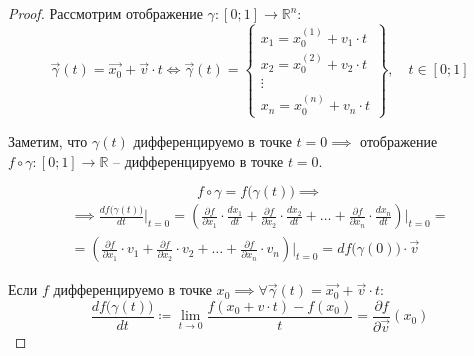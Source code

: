 \begin{proof}
    Рассмотрим отображение $\gamma:[0;1]\rightarrow \mathbb{R}^n$:
    \[
        \vec{\gamma}(t) = \vec{x_0} + \vec{v}\cdot t \iff \vec{\gamma}(t) = \left\{\begin{array}{l}
            x_1 = x_0^{(1)} + v_1 \cdot t \\
            x_2 = x_0^{(2)} + v_2 \cdot t \\
            \vdots                        \\
            x_n = x_0^{(n)} + v_n \cdot t
        \end{array}\right\}, \quad t \in [0;1]
    \]

    Заметим, что $\gamma(t)$ дифференцируемо в точке $t = 0 \implies$ отображение $f \circ \gamma:[0;1]\rightarrow\mathbb{R}$ -- дифференцируемо в точке $t = 0$.

    \[
        f\circ\gamma = f\big(\gamma(t)\big) \implies
    \]
    \begin{multline*}
        \implies \frac{df\big(\gamma(t)\big)}{dt}\bigg|_{t=0} = \left(\frac{\partial f}{\partial x_1} \cdot \frac{d x_1}{dt} + \frac{\partial f}{\partial x_2}\cdot\frac{dx_2}{dt} + \ldots + \frac{\partial f}{\partial x_n}\cdot\frac{dx_n}{dt}\right)\bigg|_{t=0} = \\
        = \left(\frac{\partial f}{\partial x_1} \cdot v_1 + \frac{\partial f}{\partial x_2} \cdot v_2 + \ldots + \frac{\partial f}{\partial x_n} \cdot v_n\right)\bigg|_{t=0} = df\big(\gamma(0)\big)\cdot \vec{v}
    \end{multline*}

    Если $f$ дифференцируемо в точке $x_0 \implies \forall \vec{\gamma}(t) = \vec{x_0} + \vec{v}\cdot t$:
    \[
        \frac{df\big(\gamma(t)\big)}{dt} \coloneqq \underset{t\rightarrow0}{\lim}\frac{f(x_0 + v\cdot t) - f(x_0)}{t} = \frac{\partial f}{\partial \vec{v}}(x_0)
    \]
\end{proof}
